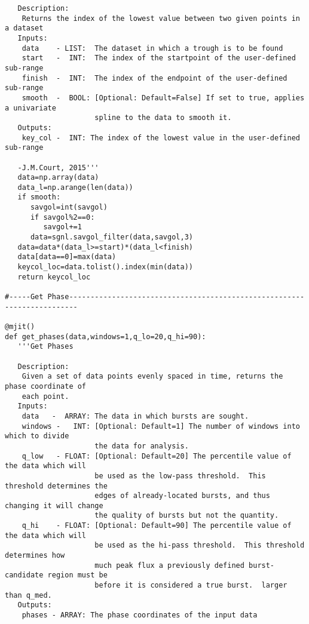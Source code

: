 \begin{verbatim}
   Description:
    Returns the index of the lowest value between two given points in a dataset
   Inputs:
    data    - LIST:  The dataset in which a trough is to be found
    start   -  INT:  The index of the startpoint of the user-defined sub-range
    finish  -  INT:  The index of the endpoint of the user-defined sub-range
    smooth  -  BOOL: [Optional: Default=False] If set to true, applies a univariate
                     spline to the data to smooth it.
   Outputs:
    key_col -  INT: The index of the lowest value in the user-defined sub-range

   -J.M.Court, 2015'''
   data=np.array(data)
   data_l=np.arange(len(data))
   if smooth:
      savgol=int(savgol)
      if savgol%2==0:
         savgol+=1
      data=sgnl.savgol_filter(data,savgol,3)
   data=data*(data_l>=start)*(data_l<finish)
   data[data==0]=max(data)      
   keycol_loc=data.tolist().index(min(data))
   return keycol_loc 

#-----Get Phase------------------------------------------------------------------------

@mjit()
def get_phases(data,windows=1,q_lo=20,q_hi=90):
   '''Get Phases

   Description:
    Given a set of data points evenly spaced in time, returns the phase coordinate of
    each point.
   Inputs:
    data   -  ARRAY: The data in which bursts are sought.
    windows -   INT: [Optional: Default=1] The number of windows into which to divide
                     the data for analysis.
    q_low   - FLOAT: [Optional: Default=20] The percentile value of the data which will
                     be used as the low-pass threshold.  This threshold determines the
                     edges of already-located bursts, and thus changing it will change
                     the quality of bursts but not the quantity.
    q_hi    - FLOAT: [Optional: Default=90] The percentile value of the data which will
                     be used as the hi-pass threshold.  This threshold determines how
                     much peak flux a previously defined burst-candidate region must be
                     before it is considered a true burst.  larger than q_med.
   Outputs:
    phases - ARRAY: The phase coordinates of the input data


\end{verbatim}
